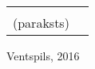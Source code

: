\begin{titlepage}
\begin{center}
\begin{singlespace}
\begin{tabular}{@{}r@{}l@{}}
{\mbox{}\hrulefill\vspace{-0.4em}\\
{\scriptsize(paraksts)}\vspace{2em}} \\
\end{tabular}
\vfill
Ventspils, 2016
\end{singlespace}
\end{center}
\end{titlepage}
